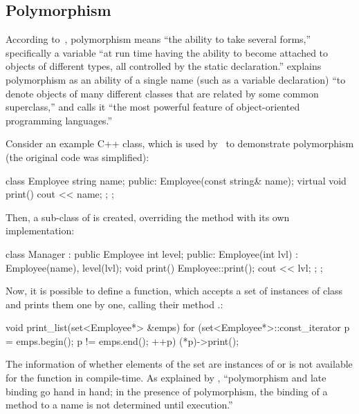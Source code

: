 \subsection{Polymorphism}

According to~\citet[p.467]{meyer1997object}, polymorphism means
``the ability to take several forms,'' specifically a variable
``at run time having the ability to become attached to objects
of different types, all controlled by the static declaration.''
\citet[p.67]{grady2007object} explains polymorphism as
an ability of a single name (such as a variable declaration)
``to denote objects of many different classes that are related by some common superclass,''
and calls it ``the most powerful feature of object-oriented programming languages.''

Consider an example C++ class, which is used by~\citet[p.310]{stroustrup1997}
to demonstrate polymorphism (the original code was simplified):

\begin{ffcode}
class Employee {
  string name;
public:
  Employee(const string& name);
  virtual void print() { cout << name; };
};
\end{ffcode}

Then, a sub-class of  is created, overriding
the method  with its own implementation:

\begin{ffcode}
class Manager : public Employee {
  int level;
public:
  Employee(int lvl) :
    Employee(name), level(lvl);
  void print() {
    Employee::print();
    cout << lvl;
  };
};
\end{ffcode}

Now, it is possible to define a function, which accepts a set
of instances of class  and prints them one by one,
calling their method .:

\begin{ffcode}
void print_list(set<Employee*> &emps) {
  for (set<Employee*>::const_iterator p =
    emps.begin(); p != emps.end(); ++p) {
    (*p)->print();
  }
}
\end{ffcode}

The information of whether elements of the set  are instances of 
or  is not available for the  function in compile-time.
As explained by \citet[p.103]{grady2007object},
``polymorphism and late binding go hand in hand;
in the presence of polymorphism, the binding of a method
to a name is not determined until execution.''

